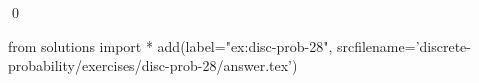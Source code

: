 
\begin{ex} 
  \label{ex:disc-prob-28}
  
  \qed
\end{ex} 
\begin{python0}
from solutions import *
add(label="ex:disc-prob-28",
    srcfilename='discrete-probability/exercises/disc-prob-28/answer.tex') 
\end{python0}
